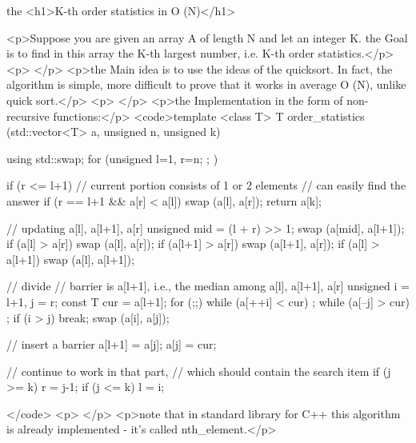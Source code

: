 the <h1>K-th order statistics in O (N)</h1>

<p>Suppose you are given an array A of length N and let an integer K. the Goal is to find in this array the K-th largest number, i.e. K-th order statistics.</p>
<p> </p>
<p>the Main idea is to use the ideas of the quicksort. In fact, the algorithm is simple, more difficult to prove that it works in average O (N), unlike quick sort.</p>
<p> </p>
<p>the Implementation in the form of non-recursive functions:</p>
<code>template <class T>
T order_statistics (std::vector<T> a, unsigned n, unsigned k)
{
using std::swap;
for (unsigned l=1, r=n; ; )
{

if (r <= l+1)
{
// current portion consists of 1 or 2 elements
// can easily find the answer
if (r == l+1 && a[r] < a[l])
swap (a[l], a[r]);
return a[k];
}

// updating a[l], a[l+1], a[r]
unsigned mid = (l + r) >> 1;
swap (a[mid], a[l+1]);
if (a[l] > a[r])
swap (a[l], a[r]);
if (a[l+1] > a[r])
swap (a[l+1], a[r]);
if (a[l] > a[l+1])
swap (a[l], a[l+1]);

// divide
// barrier is a[l+1], i.e., the median among a[l], a[l+1], a[r]
unsigned
i = l+1,
j = r;
const T
cur = a[l+1];
for (;;)
{
while (a[++i] < cur) ;
while (a[--j] > cur) ;
if (i > j)
break;
swap (a[i], a[j]);
}

// insert a barrier
a[l+1] = a[j];
a[j] = cur;

// continue to work in that part,
// which should contain the search item
if (j >= k)
r = j-1;
if (j <= k)
l = i;

}
}</code>
<p> </p>
<p>note that in standard library for C++ this algorithm is already implemented - it's called nth_element.</p>